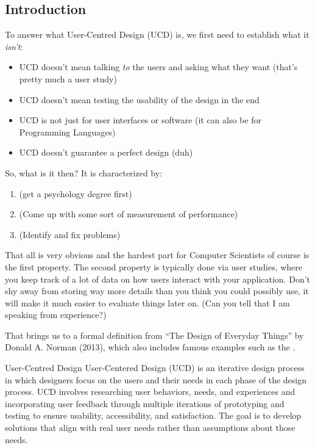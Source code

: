 \subsection{Introduction}
To answer what User-Centred Design (UCD) is, we first need to establish what it \textit{isn't}:
\begin{itemize}
    \item UCD doesn't mean talking \textit{to} the users and asking what they want {\scriptsize (that's pretty much a user study)}
    \item UCD doesn't mean testing the usability of the design in the end
    \item UCD is not just for user interfaces or software {\scriptsize (it can also be for Programming Languages)}
    \item UCD doesn't guarantee a perfect design {\scriptsize (duh)}
\end{itemize}

So, what is it then? It is characterized by:
\begin{enumerate}
    \item {} {\scriptsize (get a psychology degree first)}
    \item {} {\scriptsize (Come up with some sort of measurement of performance)}
    \item {} {\scriptsize (Identify and fix problems)}
\end{enumerate}
That all is very obvious and the hardest part for Computer Scientists of course is the first property.
The second property is typically done via user studies, where you keep track of a lot of data on how users interact with your application.
Don't shy away from storing way more details than you think you could possibly use, it will make it much easier to evaluate things later on.
    {\tiny (Can you tell that I am speaking from experience?)}

That brings us to a formal definition from ``The Design of Everyday Things'' by Donald A. Norman (2013),
which also includes famous examples such as the .

\begin{definition}[]{User-Centred Design}
    User-Centered Design (UCD) is an iterative design process in which designers focus on the users and their needs in each phase of the design process.
    UCD involves researching user behaviors, needs, and experiences and incorporating user feedback through multiple iterations of prototyping and testing to ensure usability,
    accessibility, and satisfaction. The goal is to develop solutions that align with real user needs rather than assumptions about those needs.
\end{definition}

